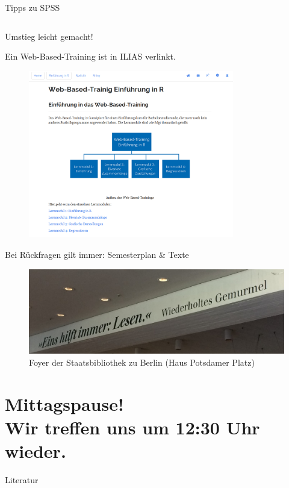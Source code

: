 \documentclass[11pt]{beamer}
\begin{document}
\begin{frame}{Tipps zu SPSS}
\begin{columns}
	\end{columns}
\end{frame}

\begin{frame}{Umstieg leicht gemacht!}
	\begin{center}
	Ein Web-Based-Training ist in ILIAS verlinkt.\\
				\begin{figure}[ht]
					\includegraphics[width=0.8\textwidth]{pics/pre13.png}
				\end{figure}	
			\end{center}		
\end{frame}

\begin{frame}{Bei Rückfragen gilt immer: Semesterplan \& Texte}
	\begin{center}
				\begin{figure}[ht]
					\includegraphics[width=\textwidth]{pics/pre14.png}
					\caption{Foyer der Staatsbibliothek zu Berlin (Haus Potsdamer Platz)}
				\end{figure}	
			\end{center}		
\end{frame}

\section{Mittagspause! \\ Wir treffen uns um 12:30 Uhr wieder.}

\begin{frame}[allowframebreaks]{Literatur}
	\nocite{*}
	\printbibliography[heading = none]
\end{frame}
\end{document}
